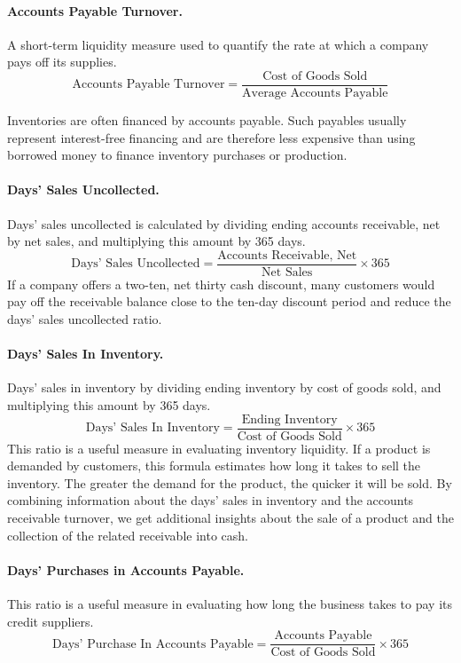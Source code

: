 \documentclass[../main.tex]{subfiles}
\begin{document}
	\paragraph{Accounts Payable Turnover.} A short-term liquidity measure used 
	to quantify the rate at which a company pays off its supplies. 
	\[
	\text{Accounts Payable Turnover} = \frac{\text{Cost of Goods 
	Sold}}{\text{Average Accounts Payable}}
	\]
	
	Inventories 
	are often financed by accounts payable. Such payables usually represent 
	interest-free financing and are therefore less expensive than using 
	borrowed money to finance inventory purchases or production.
	
	\paragraph{Days' Sales Uncollected.} Days’ sales uncollected is calculated 
	by dividing ending accounts receivable, net by net sales, and multiplying 
	this amount by 365 days. 
	\[
	\text{Days' Sales Uncollected} = \frac{\text{Accounts 
	Receivable, Net}}{\text{Net Sales}} \times 365
	\]
	If a company offers a two-ten, net thirty cash discount, many customers 
	would pay off the receivable balance close to the ten-day discount period 
	and reduce the days’ sales uncollected ratio. 
	
	\paragraph{Days' Sales In Inventory.}  Days’ sales in inventory by dividing 
	ending inventory by cost of goods sold, and multiplying this amount by 365 
	days. 
	\[
	\text{Days' Sales In Inventory} = \frac{\text{Ending Inventory}}{\text{Cost 
	of Goods Sold}} \times 365
	\]
	This ratio is a useful measure in evaluating inventory liquidity. If a 
	product is demanded by customers, this formula estimates how long it takes 
	to sell the inventory. The greater the demand for the product, the quicker 
	it will be sold. By combining information about the days’ sales in 
	inventory and the accounts receivable turnover, we get additional insights 
	about the sale of a product and the collection of the related receivable 
	into cash.
	\paragraph{Days' Purchases in Accounts Payable.} This ratio is a useful 
	measure in evaluating how long the business takes to pay its credit 
	suppliers.
	\[
	\text{Days' Purchase In Accounts Payable} = \frac{\text{Accounts 
	Payable}}{\text{Cost of Goods Sold}} \times 365
	\]
	
\end{document}
